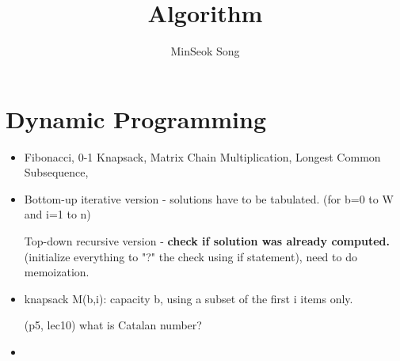 \documentclass{article}
\title{Algorithm}
\author{MinSeok Song}
\date{}
\theoremstyle{remark}
\begin{document}
\maketitle 
\section*{Dynamic Programming}
\begin{itemize}
\item Fibonacci, 0-1 Knapsack, Matrix Chain Multiplication, Longest Common Subsequence, 
\item
Bottom-up iterative version - solutions have to be tabulated. (for b=0 to W and i=1 to n)

Top-down recursive version - \textbf{check if solution was already computed.} (initialize everything to "?" the check using if statement), need to do memoization.

\item knapsack M(b,i): capacity b, using a subset of the first i items only.

(p5, lec10) what is Catalan number?

\item 

\end{itemize}
\end{document}
